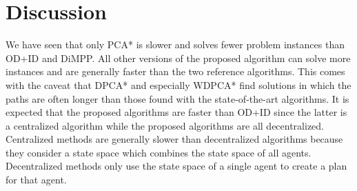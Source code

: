 \section{Discussion}\label{sec:discussion}


We have seen that only PCA* is slower and solves fewer problem instances than
OD+ID and DiMPP. All other versions of the proposed algorithm can solve more
instances and are generally faster than the two reference algorithms. This
comes with the caveat that DPCA* and especially WDPCA* find solutions in which
the paths are often longer than those found with the state-of-the-art
algorithms. It is expected that the proposed algorithms are faster than OD+ID
since the latter is a centralized algorithm while the proposed algorithms are
all decentralized. Centralized methods are generally slower than decentralized
algorithms because they consider a state space which combines the state space
of all agents. Decentralized methods only use the state space of a single agent
to create a plan for that agent.

